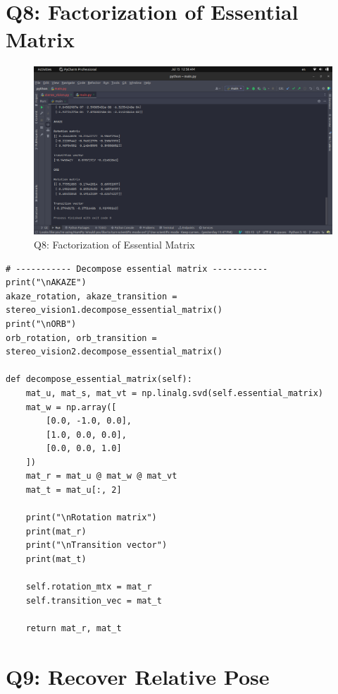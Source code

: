 \documentclass[a4paper, 12pt]{article}
\begin{document}
    \section{Q8:  Factorization of Essential Matrix}

    \begin{figure}
		\caption{Q8: Factorization of Essential Matrix}
		\includegraphics[scale=0.25]{img/factorization.png}
	\end{figure}

    \begin{lstlisting}
# ----------- Decompose essential matrix -----------
print("\nAKAZE")
akaze_rotation, akaze_transition = stereo_vision1.decompose_essential_matrix()
print("\nORB")
orb_rotation, orb_transition = stereo_vision2.decompose_essential_matrix()

def decompose_essential_matrix(self):
    mat_u, mat_s, mat_vt = np.linalg.svd(self.essential_matrix)
    mat_w = np.array([
        [0.0, -1.0, 0.0],
        [1.0, 0.0, 0.0],
        [0.0, 0.0, 1.0]
    ])
    mat_r = mat_u @ mat_w @ mat_vt
    mat_t = mat_u[:, 2]

    print("\nRotation matrix")
    print(mat_r)
    print("\nTransition vector")
    print(mat_t)

    self.rotation_mtx = mat_r
    self.transition_vec = mat_t

    return mat_r, mat_t
    \end{lstlisting}

    \section{Q9:  Recover Relative Pose}
    
\end{document}
